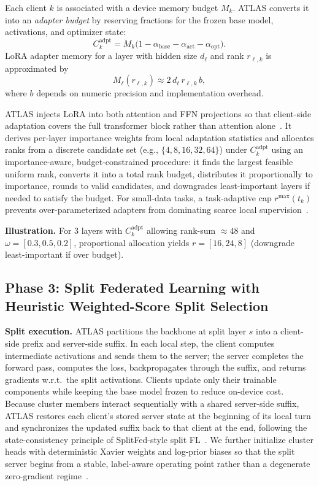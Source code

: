 \documentclass[conference]{IEEEtran}
\begin{document}
Each client $k$ is associated with a device memory budget $M_k$. ATLAS converts it into an \emph{adapter budget} by reserving fractions for the frozen base model, activations, and optimizer state:
\begin{equation}
C^{\text{adpt}}_k = M_k \big(1-\alpha_{\text{base}}-\alpha_{\text{act}}-\alpha_{\text{opt}}\big).
\end{equation}
LoRA adapter memory for a layer with hidden size $d_{\ell}$ and rank $r_{\ell,k}$ is approximated by
\begin{equation}
M_{\ell}(r_{\ell,k}) \approx 2\, d_{\ell}\, r_{\ell,k}\, b,
\end{equation}
where $b$ depends on numeric precision and implementation overhead.

ATLAS injects LoRA into both attention and FFN projections so that client-side adaptation covers the full transformer block rather than attention alone~\cite{lora}. It derives per-layer importance weights from local adaptation statistics and allocates ranks from a discrete candidate set (e.g., $\{4,8,16,32,64\}$) under $C^{\text{adpt}}_k$ using an importance-aware, budget-constrained procedure: it finds the largest feasible uniform rank, converts it into a total rank budget, distributes it proportionally to importance, rounds to valid candidates, and downgrades least-important layers if needed to satisfy the budget. For small-data tasks, a task-adaptive cap $r^{\max}(t_k)$ prevents over-parameterized adapters from dominating scarce local supervision~\cite{lora,fah_qlora}.

\textbf{Illustration.} For 3 layers with $C_k^\text{adpt}$ allowing rank-sum $\approx 48$ and $\omega = [0.3, 0.5, 0.2]$, proportional allocation yields $r = [16, 24, 8]$ (downgrade least-important if over budget).

\subsection{Phase 3: Split Federated Learning with Heuristic Weighted-Score Split Selection}
\label{subsec:phase3}

\textbf{Split execution.}
ATLAS partitions the backbone at split layer $s$ into a client-side prefix and server-side suffix. In each local step, the client computes intermediate activations and sends them to the server; the server completes the forward pass, computes the loss, backpropagates through the suffix, and returns gradients w.r.t.\ the split activations. Clients update only their trainable components while keeping the base model frozen to reduce on-device cost. Because cluster members interact sequentially with a shared server-side suffix, ATLAS restores each client's stored server state at the beginning of its local turn and synchronizes the updated suffix back to that client at the end, following the state-consistency principle of SplitFed-style split FL~\cite{splitfed}. We further initialize cluster heads with deterministic Xavier weights and log-prior biases so that the split server begins from a stable, label-aware operating point rather than a degenerate zero-gradient regime~\cite{xavier}.
\end{document}
